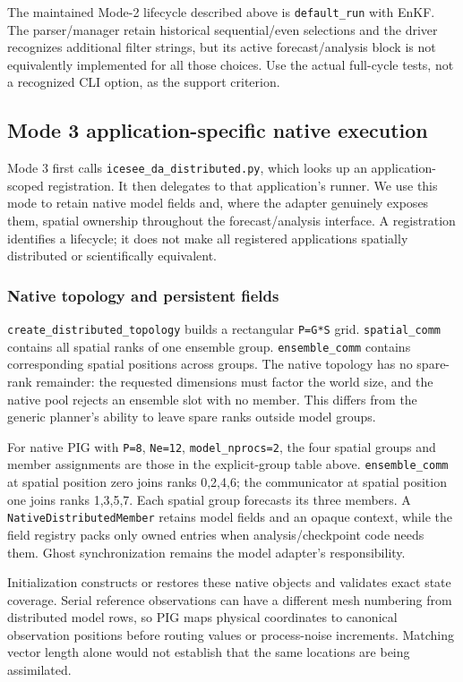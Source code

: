 \documentclass[11pt,a4paper]{article}
\newcommand{\code}[1]{\nolinkurl{#1}}
\begin{document}
The maintained Mode-2 lifecycle described above is \code{default_run} with EnKF. The parser/manager retain historical sequential/even selections and the driver recognizes additional filter strings, but its active forecast/analysis block is not equivalently implemented for all those choices. Use the actual full-cycle tests, not a recognized CLI option, as the support criterion.

\subsection{Mode 3 application-specific native execution}

Mode 3 first calls \code{icesee_da_distributed.py}, which looks up an application-scoped registration. It then delegates to that application's runner. We use this mode to retain native model fields and, where the adapter genuinely exposes them, spatial ownership throughout the forecast/analysis interface. A registration identifies a lifecycle; it does not make all registered applications spatially distributed or scientifically equivalent.

\subsubsection{Native topology and persistent fields}

\code{create_distributed_topology} builds a rectangular \code{P=G*S} grid. \code{spatial_comm} contains all spatial ranks of one ensemble group. \code{ensemble_comm} contains corresponding spatial positions across groups. The native topology has no spare-rank remainder: the requested dimensions must factor the world size, and the native pool rejects an ensemble slot with no member. This differs from the generic planner's ability to leave spare ranks outside model groups.

For native PIG with \code{P=8}, \code{Ne=12}, \code{model_nprocs=2}, the four spatial groups and member assignments are those in the explicit-group table above. \code{ensemble_comm} at spatial position zero joins ranks 0,2,4,6; the communicator at spatial position one joins ranks 1,3,5,7. Each spatial group forecasts its three members. A \code{NativeDistributedMember} retains model fields and an opaque context, while the field registry packs only owned entries when analysis/checkpoint code needs them. Ghost synchronization remains the model adapter's responsibility.

Initialization constructs or restores these native objects and validates exact state coverage. Serial reference observations can have a different mesh numbering from distributed model rows, so PIG maps physical coordinates to canonical observation positions before routing values or process-noise increments. Matching vector length alone would not establish that the same locations are being assimilated.
\end{document}

